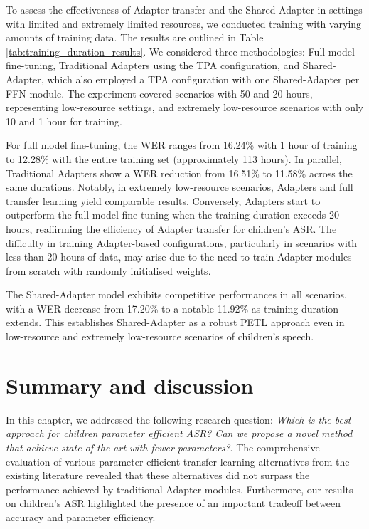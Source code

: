 To assess the effectiveness of Adapter-transfer and the Shared-Adapter in settings with limited and extremely limited resources, we conducted training with varying amounts of training data. The results are outlined in Table \ref{tab:training_duration_results}. We considered three methodologies: Full model fine-tuning, Traditional Adapters using the \ac{TPA} configuration, and Shared-Adapter, which also employed a \ac{TPA} configuration with one Shared-Adapter per \ac{FFN} module. The experiment covered scenarios with 50 and 20 hours, representing low-resource settings, and extremely low-resource scenarios with only 10 and 1 hour for training.

For full model fine-tuning, the \ac{WER} ranges from 16.24\% with 1 hour of training to 12.28\% with the entire training set (approximately 113 hours). In parallel, Traditional Adapters show a \ac{WER} reduction from 16.51\% to 11.58\% across the same durations. Notably, in extremely low-resource scenarios, Adapters and full transfer learning yield comparable results. Conversely, Adapters start to outperform the full model fine-tuning when the training duration exceeds 20 hours, reaffirming the efficiency of Adapter transfer for children's \ac{ASR}. The difficulty in training Adapter-based configurations, particularly in scenarios with less than 20 hours of data, may arise due to the need to train Adapter modules from scratch with randomly initialised weights. 

The Shared-Adapter model exhibits competitive performances in all scenarios, with a \ac{WER} decrease from 17.20\% to a notable 11.92\% as training duration extends. This establishes Shared-Adapter as a robust \ac{PETL} approach even in low-resource and extremely low-resource scenarios of children's speech.

\section{Summary and discussion}
In this chapter, we addressed the following research question: \textit{Which is the best approach for children parameter efficient \ac{ASR}? Can we propose a novel method that achieve state-of-the-art with fewer parameters?}. The comprehensive evaluation of various parameter-efficient transfer learning alternatives from the existing literature revealed that these alternatives did not surpass the performance achieved by traditional Adapter modules. Furthermore, our results on children's \ac{ASR} highlighted the presence of an important tradeoff between accuracy and parameter efficiency.

